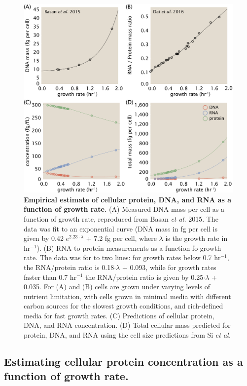 \begin{figure}
		\centering
    \includegraphics[width=1\textwidth]{../../figures/schmidt_estimate_protein_RNA_DNA_corrections.pdf}
  \caption{{\bf Empirical estimate of cellular protein, DNA, and RNA as a function of growth rate.} (A) Measured DNA mass per cell as a function of growth rate, reproduced from Basan \textit{et al.} 2015. The data was fit to an exponential curve (DNA mass in fg per cell is given by 0.42 $e^{2.23 \cdot \lambda}$ + 7.2 fg per cell, where $\lambda$ is the growth rate in hr$^{-1}$). (B) RNA to protein measurements as a function fo growth rate. The data was for to two lines: for growth rates below 0.7 hr$^{-1}$, the RNA/protein ratio is 0.18$\cdot \lambda$ + 0.093, while for growth rates faster than 0.7 hr$^{-1}$ the RNA/protein ratio is given by 0.25$\cdot \lambda$ + 0.035. For (A) and (B)
cells are grown under varying levels of nutrient limitation, with cells grown in minimal media with different carbon sources for the slowest growth conditions, and rich-defined media for fast growth rates. (C) Predictions of
cellular protein, DNA, and RNA concentration. (D) Total cellular mass predicted for protein, DNA, and RNA using the cell size predictions from Si \textit{et al.}
	 	}
  \label{fig:schmidt_adjustment_varying_conc}
\end{figure}


\subsection{Estimating cellular protein concentration as a function of growth rate.}


